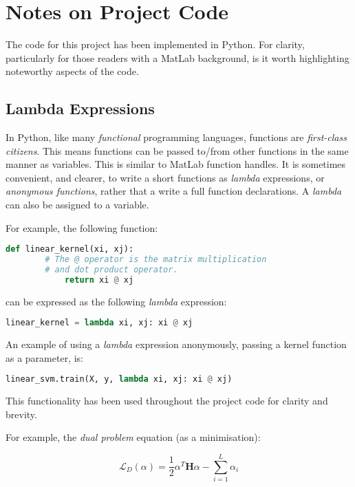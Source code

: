 \documentclass[10pt, a4paper,reqno]{amsart}
\begin{document}
%
%
\clearpage\section{Notes on Project Code}

The code for this project has been implemented in Python. For clarity, particularly for those readers with a MatLab background, is it worth highlighting noteworthy aspects of the code.

\subsection{Lambda Expressions}
In Python, like many \emph{functional} programming languages, functions are \emph{first-class citizens}. This means functions can be passed to/from other functions in the same manner as variables. This is similar to MatLab function handles. It is sometimes convenient, and clearer, to write a short functions as \emph{lambda} expressions, or \emph{anonymous functions}, rather that a write a full function declarations. A \emph{lambda} can also be assigned to a variable.

For example, the following function:

\begin{lstlisting}[language=Python]
	def linear_kernel(xi, xj):
		# The @ operator is the matrix multiplication
		# and dot product operator.
    		return xi @ xj
\end{lstlisting}

can be expressed as the following \emph{lambda} expression:

\begin{lstlisting}[language=Python]
	linear_kernel = lambda xi, xj: xi @ xj
\end{lstlisting}

An example of using a \emph{lambda} expression anonymously, passing a kernel function as a parameter, is:

\begin{lstlisting}[language=Python]
	linear_svm.train(X, y, lambda xi, xj: xi @ xj)
\end{lstlisting}

This functionality has been used throughout the project code for clarity and brevity.

For example, the \emph{dual problem} equation (as a minimisation):

\begin{equation}
\mathcal{L}_D(\alpha) = \frac{1}{2}\alpha^T\mathbf{H}\alpha - \sum_{i=1}^{L}\alpha_i
\end{equation}
\end{document}
